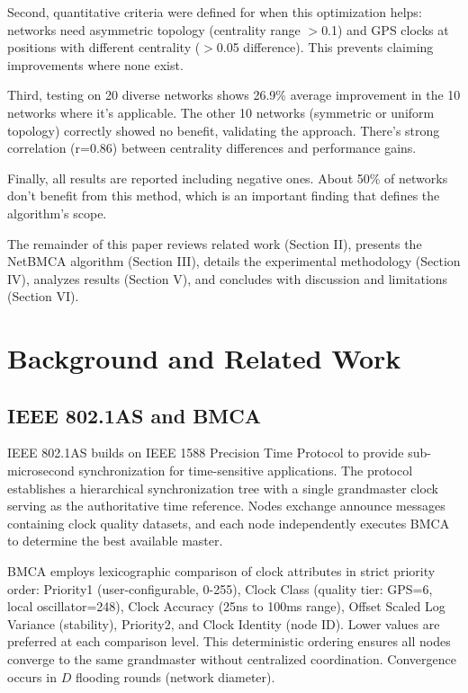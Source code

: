 \documentclass[conference]{IEEEtran}
\begin{document}
Second, quantitative criteria were defined for when this optimization helps: networks need asymmetric topology (centrality range $>$0.1) and GPS clocks at positions with different centrality ($>$0.05 difference). This prevents claiming improvements where none exist.

Third, testing on 20 diverse networks shows 26.9\% average improvement in the 10 networks where it's applicable. The other 10 networks (symmetric or uniform topology) correctly showed no benefit, validating the approach. There's strong correlation (r=0.86) between centrality differences and performance gains.

Finally, all results are reported including negative ones. About 50\% of networks don't benefit from this method, which is an important finding that defines the algorithm's scope.

The remainder of this paper reviews related work (Section II), presents the NetBMCA algorithm (Section III), details the experimental methodology (Section IV), analyzes results (Section V), and concludes with discussion and limitations (Section VI).

\section{Background and Related Work}

\subsection{IEEE 802.1AS and BMCA}

IEEE 802.1AS \cite{ieee8021as} builds on IEEE 1588 Precision Time Protocol \cite{ieee1588} to provide sub-microsecond synchronization for time-sensitive applications. The protocol establishes a hierarchical synchronization tree with a single grandmaster clock serving as the authoritative time reference. Nodes exchange announce messages containing clock quality datasets, and each node independently executes BMCA to determine the best available master.

BMCA employs lexicographic comparison of clock attributes in strict priority order: Priority1 (user-configurable, 0-255), Clock Class (quality tier: GPS=6, local oscillator=248), Clock Accuracy (25ns to 100ms range), Offset Scaled Log Variance (stability), Priority2, and Clock Identity (node ID). Lower values are preferred at each comparison level. This deterministic ordering ensures all nodes converge to the same grandmaster without centralized coordination. Convergence occurs in $D$ flooding rounds (network diameter).
\end{document}
